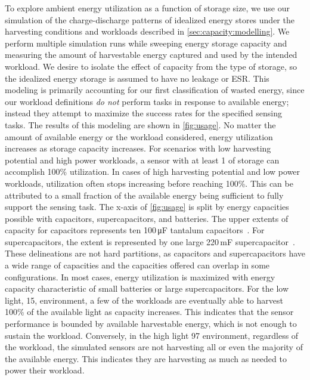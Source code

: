 To explore ambient energy utilization as a function of storage size, we
use our simulation of the charge-discharge patterns of idealized energy stores under
the harvesting conditions and workloads described in \cref{sec:capacity:modelling}.
We perform multiple simulation runs while sweeping energy storage capacity and measuring the amount of harvestable energy captured and used by the intended workload.
We desire to isolate the effect of capacity from the type of storage, so the
idealized energy storage is assumed to have no leakage or ESR. 
This modeling is primarily accounting for our first classification of
wasted energy, since our workload definitions \textit{do not} perform
tasks in response to available energy; instead they attempt to maximize the success
rates for the specified sensing tasks.
The results of this modeling are shown in \cref{fig:usage}.
No matter the amount of available energy or the workload considered, energy utilization increases as
storage capacity increases. For scenarios with low harvesting potential and high
power workloads, a sensor with at least 1\ssi{\milli\Wh} of storage can accomplish 100\% utilization.
In cases of
high harvesting potential and low power workloads, utilization often
stops increasing before reaching 100\%. This
can be attributed to a small fraction of the available energy being sufficient
to fully support the sensing task.
The x-axis of \cref{fig:usage} is split by energy capacities possible with capacitors, supercapacitors, and
batteries. 
The upper extents of capacity for capacitors represents ten 100\,\si{\micro\farad} tantalum capacitors~\cite{tantalumDatasheet}. 
For supercapacitors, the extent is represented by one
large 220\,mF supercapacitor~\cite{murataCap}. 
These delineations are not hard partitions, as capacitors and supercapacitors have a wide range of capacities and the capacities offered can overlap in some configurations.
In most cases, energy utilization is maximized with energy capacity characteristic of small batteries or large supercapacitors.
For the low light, 15\ssi[per-mode=symbol]{\micro\watt\per\centi\meter\squared}, environment, a few of the workloads are eventually able to harvest 100\% of the available light as capacity increases. This indicates that the sensor performance is bounded by available harvestable energy, which is not enough to sustain the workload.
Conversely, in the high light 97\ssi[per-mode=symbol]{\micro\watt\per\centi\meter\squared} environment, regardless of the workload, the simulated sensors are not harvesting all or even the majority of the available energy. 
This indicates they are harvesting as much as needed to power their workload. 

